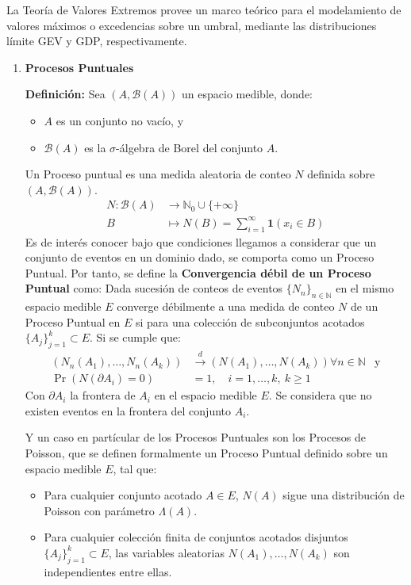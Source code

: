 La Teoría de Valores Extremos provee un marco teórico para el modelamiento de valores máximos o excedencias sobre un umbral, mediante las distribuciones límite GEV y GDP,
respectivamente.
\begin{enumerate}

\item \textbf{Procesos Puntuales}

    \textbf{Definición:}
    Sea $(A, \mathcal{B}(A))$ un espacio medible, donde:
    \begin{itemize}
        \item $A$ es un conjunto no vacío, y
        \item $\mathcal{B}(A)$ es la $\sigma$-álgebra de Borel del conjunto $A$.
    \end{itemize}
    Un Proceso puntual es una medida aleatoria de conteo $N$ definida sobre $(A, \mathcal{B}(A))$.
    \begin{align*}
        N: \mathcal{B}(A) &\longrightarrow \mathbb{N}_0 \cup \{+\infty\} \\
        B &\longmapsto N(B) = \sum_{i=1}^{\infty} \mathbf{1}(x_i \in B)
    \end{align*}
    Es de interés conocer bajo que condiciones llegamos a considerar que un conjunto de eventos en un dominio dado, se comporta como un Proceso Puntual. Por tanto, se define
    la \textbf{Convergencia débil de un Proceso Puntual} como:
        Dada sucesión de conteos de eventos $\{N_n\}_{n\in\mathbb{N}}$ en el mismo espacio medible $E$
        converge débilmente a una medida de conteo $N$ de un Proceso Puntual en $E$ si para una colección de subconjuntos acotados $\{A_j\}_{j=1}^k \subset E$. Si se cumple que:
        \begin{align*}
            (N_n(A_1),\ldots,N_n(A_k)) &\overset{d}{\longrightarrow} (N(A_1),\ldots,N(A_k)) \forall n\in\mathbb{N} &\text{y} \\
            \Pr(N(\partial A_i)=0) &= 1, \quad i=1,\ldots,k,\ k \geq 1
        \end{align*}
        Con $\partial A_i$ la frontera de $A_i$ en el espacio medible $E$. Se considera que no existen eventos en la frontera del conjunto $A_i$.
        \cite{daley2008introduction}
    
    Y un caso en partícular de los Procesos Puntuales son los Procesos de Poisson, que se definen formalmente un Proceso Puntual definido sobre un espacio medible $E$, tal que:
    \begin{itemize}
        \item Para cualquier conjunto acotado $A \in E$, $N(A)$ sigue una distribución de Poisson con parámetro $\Lambda(A)$.
        \item Para cualquier colección finita de conjuntos acotados disjuntos $\{A_j\}_{j=1}^k \subset E$, las variables aleatorias $N(A_1),\ldots,N(A_k)$ son independientes
        entre ellas.
        \cite{daley2003introduction}
    \end{itemize} 


\end{enumerate}
